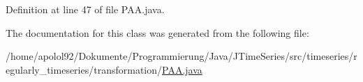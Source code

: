 Definition at line 47 of file P\+A\+A.\+java.



The documentation for this class was generated from the following file\+:\begin{DoxyCompactItemize}
\item 
/home/apolol92/\+Dokumente/\+Programmierung/\+Java/\+J\+Time\+Series/src/timeseries/regularly\+\_\+timeseries/transformation/\hyperlink{_p_a_a_8java}{P\+A\+A.\+java}\end{DoxyCompactItemize}
